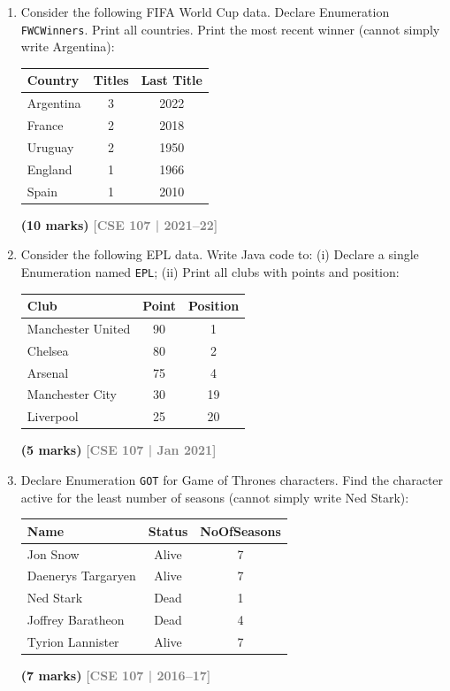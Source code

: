 \documentclass[12pt,a3paper]{article}
\newcommand{\yr}[1]{\hfill\textcolor{gray}{\small\textbf{[#1]}}}
\newcommand{\mk}[1]{\textcolor{orange!70!black}{\small\textbf{(#1 marks)}}}
\begin{document}
\begin{enumerate}
\item Consider the following FIFA World Cup data. Declare Enumeration \texttt{FWCWinners}. Print all countries. Print the most recent winner (cannot simply write Argentina):
\begin{center}
\begin{tabular}{lcc}
\toprule
\textbf{Country} & \textbf{Titles} & \textbf{Last Title}\\
\midrule
Argentina & 3 & 2022 \\
France & 2 & 2018 \\
Uruguay & 2 & 1950 \\
England & 1 & 1966 \\
Spain & 1 & 2010 \\
\bottomrule
\end{tabular}
\end{center}
\mk{10}
\yr{CSE 107 | 2021--22}




\item Consider the following EPL data. Write Java code to: (i) Declare a single Enumeration named \texttt{EPL}; (ii) Print all clubs with points and position:
\begin{center}
\begin{tabular}{lcc}
\toprule
\textbf{Club} & \textbf{Point} & \textbf{Position}\\
\midrule
Manchester United & 90 & 1 \\
Chelsea & 80 & 2 \\
Arsenal & 75 & 4 \\
Manchester City & 30 & 19 \\
Liverpool & 25 & 20 \\
\bottomrule
\end{tabular}
\end{center}
\mk{5}
\yr{CSE 107 | Jan 2021}





\item Declare Enumeration \texttt{GOT} for Game of Thrones characters. Find the character active for the least number of seasons (cannot simply write Ned Stark):
\begin{center}
\begin{tabular}{lcc}
\toprule
\textbf{Name} & \textbf{Status} & \textbf{NoOfSeasons}\\
\midrule
Jon Snow & Alive & 7 \\
Daenerys Targaryen & Alive & 7 \\
Ned Stark & Dead & 1 \\
Joffrey Baratheon & Dead & 4 \\
Tyrion Lannister & Alive & 7 \\
\bottomrule
\end{tabular}
\end{center}
\mk{7}
\yr{CSE 107 | 2016--17}


\end{enumerate}
\end{document}

